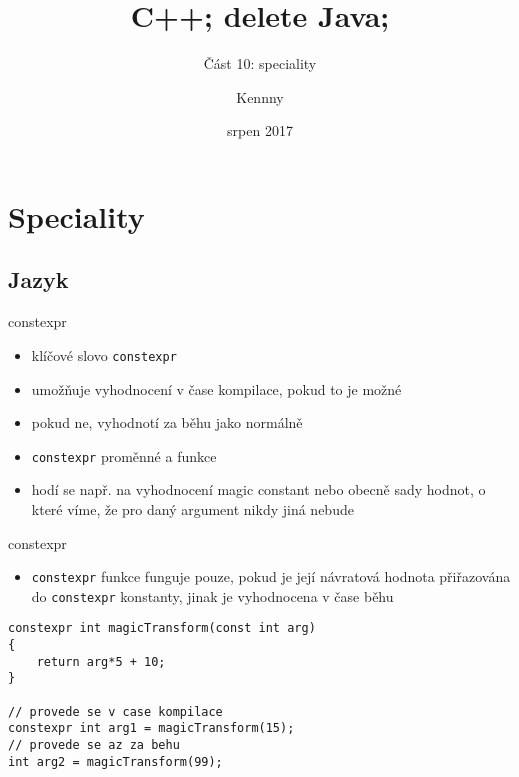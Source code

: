 \documentclass{beamer}
\begin{document}
\title{C++; delete Java;}
\subtitle{Část 10: speciality}
\author{Kennny}
\date{srpen 2017}

\frame{\titlepage}


\newenvironment{xframe}[1][]
  {\begin{frame}[fragile,environment=xframe,#1]}
  {\end{frame}}

\begin{comment}
\begin{xframe}{tttt}
	\begin{itemize}
		\item
	\end{itemize}
\end{xframe}
\end{comment}



\section{Speciality}
\subsection{Jazyk}



\begin{xframe}{constexpr}
	\begin{itemize}
		\item klíčové slovo \texttt{constexpr}
		\item umožňuje vyhodnocení v čase kompilace, pokud to je možné
		\item pokud ne, vyhodnotí za běhu jako normálně
		\item \texttt{constexpr} proměnné a funkce
		\item hodí se např. na vyhodnocení magic constant nebo obecně sady hodnot, o které víme, že pro daný argument nikdy jiná nebude
	\end{itemize}
\end{xframe}

\begin{xframe}{constexpr}
	\begin{itemize}
		\item \texttt{constexpr} funkce funguje pouze, pokud je její návratová hodnota přiřazována do \texttt{constexpr} konstanty, jinak je vyhodnocena v čase běhu
	\end{itemize}
	
\begin{lstlisting}[basicstyle=\fontsize{8}{9}\selectfont\ttfamily]
constexpr int magicTransform(const int arg)
{
    return arg*5 + 10;
}

// provede se v case kompilace
constexpr int arg1 = magicTransform(15);
// provede se az za behu
int arg2 = magicTransform(99);
\end{lstlisting}
\end{xframe}
\end{document}
